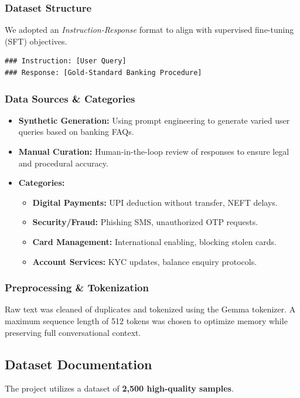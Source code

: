 \documentclass[12pt,a4paper]{article}
\begin{document}
\subsubsection{Dataset Structure}
We adopted an \textit{Instruction-Response} format to align with supervised fine-tuning (SFT) objectives.
\begin{verbatim}
### Instruction: [User Query]
### Response: [Gold-Standard Banking Procedure]
\end{verbatim}

\subsubsection{Data Sources \& Categories}
\begin{itemize}
    \item \textbf{Synthetic Generation:} Using prompt engineering to generate varied user queries based on banking FAQs.
    \item \textbf{Manual Curation:} Human-in-the-loop review of responses to ensure legal and procedural accuracy.
    \item \textbf{Categories:} 
    \begin{itemize}
        \item \textbf{Digital Payments:} UPI deduction without transfer, NEFT delays.
        \item \textbf{Security/Fraud:} Phishing SMS, unauthorized OTP requests.
        \item \textbf{Card Management:} International enabling, blocking stolen cards.
        \item \textbf{Account Services:} KYC updates, balance enquiry protocols.
    \end{itemize}
\end{itemize}

\subsubsection{Preprocessing \& Tokenization}
Raw text was cleaned of duplicates and tokenized using the Gemma tokenizer. A maximum sequence length of 512 tokens was chosen to optimize memory while preserving full conversational context.

\subsection{Dataset Documentation}
The project utilizes a dataset of \textbf{2,500 high-quality samples}.
\end{document}
